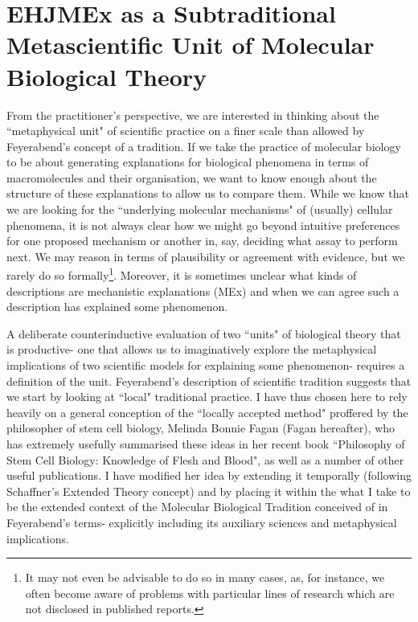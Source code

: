\section {EHJMEx as a Subtraditional Metascientific Unit of Molecular Biological Theory}
\label{EHJMEx}

From the practitioner's perspective, we are interested in thinking about the ``metaphysical unit" of scientific practice on a finer scale than allowed by Feyerabend's concept of a tradition. If we take the practice of molecular biology to be about generating explanations for biological phenomena in terms of macromolecules and their organisation, we want to know enough about the structure of these explanations to allow us to compare them. While we know that we are looking for the ``underlying molecular mechanisms" of (usually) cellular phenomena, it is not always clear how we might go beyond intuitive preferences for one proposed mechanism or another in, say, deciding what assay to perform next. We may reason in terms of plausibility or agreement with evidence, but we rarely do so formally\footnote{It may not even be advisable to do so in many cases, as, for instance, we often become aware of problems with particular lines of research which are not disclosed in published reports.}. Moreover, it is sometimes unclear what kinds of descriptions are mechanistic explanations (MEx) and when we can agree such a description has explained some phenomenon.

A deliberate counterinductive evaluation of two ``units" of biological theory that is productive- one that allows us to imaginatively explore the metaphysical implications of two scientific models for explaining some phenomenon- requires a definition of the unit. Feyerabend's description of scientific tradition suggests that we start by looking at ``local" traditional practice. I have thus chosen here to rely heavily on a general conception of the ``locally accepted method" proffered by the philosopher of stem cell biology, Melinda Bonnie Fagan (Fagan hereafter), who has extremely usefully summarised these ideas in her recent book ``Philosophy of Stem Cell Biology: Knowledge of Flesh and Blood", as well as a number of other useful publications\cite{Fagan2013,Fagan2015,Fagan2015a}. I have modified her idea by extending it temporally (following Schaffner's Extended Theory concept\cite[p.211]{Schaffner1993}) and by placing it within the what I take to be the extended context of the Molecular Biological Tradition conceived of in Feyerabend's terms- explicitly including its auxiliary sciences and metaphysical implications.

